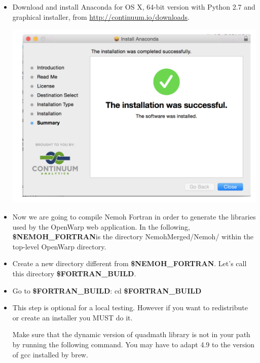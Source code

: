 \documentclass[12pt]{article}
\newcommand{\NEMOHFORTRAN}{{\textbf{\$NEMOH{\_}FORTRAN}}}
\newcommand{\FORTRANBUILD}{{\textbf{\$FORTRAN{\_}BUILD}}}
\begin{document}
\begin{itemize}
					\item 
					Download and install Anaconda for OS X, 64-bit version with Python 2.7 and graphical installer, from \url{http://continuum.io/downloads}.  
					
					\vspace{\abovedisplayskip}
						\begin{minipage}{\linewidth}
							\centering
							\includegraphics[scale=0.75]{img/13}
						\end{minipage}
					\vspace{\belowdisplayskip}
					
					\item Now we are going to compile Nemoh Fortran in order to generate the libraries used by the OpenWarp web application. In the following, \NEMOHFORTRAN is the directory NemohMerged/Nemoh/ within the top-level OpenWarp directory.
					\item Create a new directory different from \NEMOHFORTRAN. Let's call this directory \FORTRANBUILD.
					\item Go to \FORTRANBUILD:
					{ \color{blue}cd \FORTRANBUILD}
					
					\item 
					This step is optional for a local testing. However if you want to redistribute or create an installer you MUST do it.
					
					Make sure that the dynamic version of quadmath library is not in your path by running the following command. You may have to adapt 4.9 to the version of gcc installed by brew.
					

\end{itemize}
\end{document}
